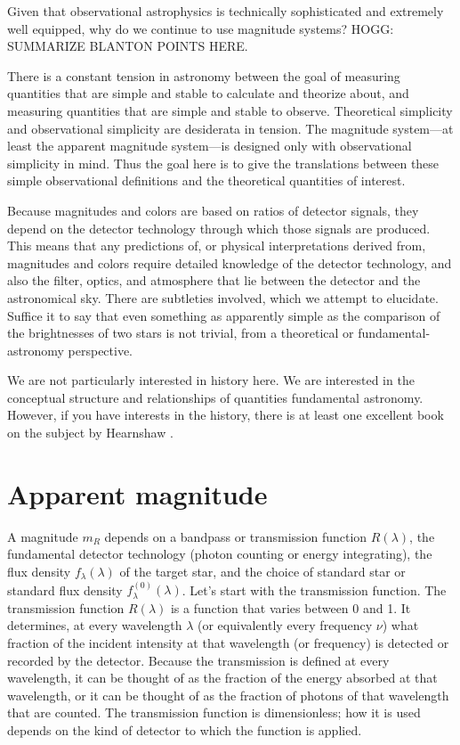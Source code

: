 \documentclass[10pt]{article}
\begin{document}
Given that observational astrophysics is technically sophisticated and extremely well equipped, why do we continue to use magnitude systems?
HOGG: SUMMARIZE BLANTON POINTS HERE.

There is a constant tension in astronomy between the goal of measuring quantities that are simple and stable to calculate and theorize about, and measuring quantities that are simple and stable to observe.
Theoretical simplicity and observational simplicity are desiderata in tension.
The magnitude system---at least the apparent magnitude system---is designed only with observational simplicity in mind.
Thus the goal here is to give the translations between these simple observational definitions and the theoretical quantities of interest.

Because magnitudes and colors are based on ratios of detector signals, they depend on the detector technology through which those signals are produced.
This means that any predictions of, or physical interpretations derived from, magnitudes and colors require detailed knowledge of the detector technology, and also the filter, optics, and atmosphere that lie between the detector and the astronomical sky.
There are subtleties involved, which we attempt to elucidate.
Suffice it to say that even something as apparently simple as the comparison of the brightnesses of two stars is not trivial, from a theoretical or fundamental-astronomy perspective.

We are not particularly interested in history here.
We are interested in the conceptual structure and relationships of quantities fundamental astronomy.
However, if you have interests in the history, there is at least one excellent book on the subject by Hearnshaw \cite{hearnshaw}.

\section{Apparent magnitude}\label{sec:mag}

A magnitude $m_R$ depends on a bandpass or transmission function $R(\lambda)$, the fundamental detector technology (photon counting or energy integrating), the flux density $f_\lambda(\lambda)$ of the target star, and the choice of standard star or standard flux density $f^{(0)}_\lambda(\lambda)$.
Let's start with the transmission function.
The transmission function $R(\lambda)$ is a function that varies between 0 and 1.
It determines, at every wavelength $\lambda$ (or equivalently every frequency $\nu$) what fraction of the incident intensity at that wavelength (or frequency) is detected or recorded by the detector.
Because the transmission is defined at every wavelength, it can be thought of as the fraction of the energy absorbed at that wavelength, or it can be thought of as the fraction of photons of that wavelength that are counted.
The transmission function is dimensionless; how it is used depends on the kind of detector to which the function is applied.
\end{document}
